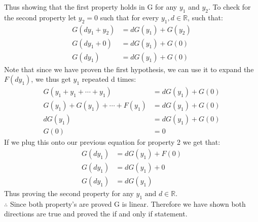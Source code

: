 \documentclass[11pt]{article}
\begin{document}
Thus showing that the first property holds in G for any $y_1$ and $y_2$. To check for the second property let $y_2 = 0$ such that for every $y_1, d \in \mathbb{R}$, such that:
\begin{align*}
G(dy_1 + y_2) &= dG(y_1) + G(y_2)\\
G(dy_1 + 0) &= dG(y_1) + G(0)\\
G(dy_1) &= dG(y_1) + G(0)
\end{align*}
Note that since we have proven the first hypothesis, we can use it to expand the $F(dy_1)$, we thus get $y_1$ repeated d times:
\begin{align*}
G(y_1 + y_1 + \cdots + y_1) &= dG(y_1) + G(0)\\
G(y_1) + G(y_1) + \cdots + F(y_1) &= dG(y_1) + G(0)\\
dG(y_1) &= dG(y_1) + G(0)\\
G(0) &= 0
\end{align*}
If we plug this onto our previous equation for property 2 we get that:
\begin{align*}
G(dy_1) &= dG(y_1) + F(0)\\
G(dy_1) &= dG(y_1) + 0\\
G(dy_1) &= dG(y_1)
\end{align*}
Thus proving the second property for any $y_1 \text{ and } d \in \mathbb{R}$.\\
$\therefore$ Since both property's are proved G is linear. Therefore we have shown both directions are true and proved the if and only if statement.
\end{document}
